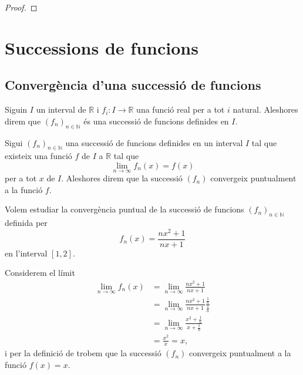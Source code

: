 \documentclass[../Apunts.tex]{subfiles}
\begin{document}
\begin{theorem}
\begin{proof}
\begin{comment}
			Aleshores amb \eqref{thm:Teorema de Cauchy:eq1} i \eqref{thm:Teorema de Cauchy:eq2} tenim que
			\[\abs{\sum_{n=1}^{m}a_{\sigma(n)}b_{\tau(n)}-\sum_{n=0}^{\infty}a_{n}\sum_{n=0}^{\infty}b_{n}}+\abs{\sum_{n=0}^{N}a_{n}\sum_{n=0}^{N}b_{n}-\sum_{n=0}^{\infty}a_{n}\sum_{n=0}^{\infty}b_{n}}\leq\varepsilon,\]
			i per la desigualtat triangular %
			\[\abs{\sum_{n=1}^{m}a_{\sigma(n)}b_{\tau(n)}-\sum_{n=0}^{N}a_{n}\sum_{n=0}^{N}b_{n}}+\abs{\sum_{n=0}^{N}a_{n}\sum_{n=0}^{N}b_{n}-\sum_{n=0}^{\infty}a_{n}\sum_{n=0}^{\infty}b_{n}}\leq\varepsilon,\]
		\end{comment}
		\end{proof}
	\end{theorem}
\section{Successions de funcions}
	\subsection{Convergència d'una successió de funcions}
	\begin{definition}
		\label{def:successió de funcions}
		Siguin \(I\) un interval de \(\mathbb{R}\) i \(f_{i}\colon I\longrightarrow\mathbb{R}\) una funció real per a tot \(i\) natural. Aleshores direm que \((f_{n})_{n\in\mathbb{N}}\) és una successió de funcions definides en \(I\).
	\end{definition}
	\begin{definition}
		\label{def:convergència puntual}
		Sigui \((f_{n})_{n\in\mathbb{N}}\) una successió de funcions definides en un interval \(I\) tal que existeix una funció \(f\) de \(I\) a \(\mathbb{R}\) tal que
		\[\lim_{n\to\infty}f_{n}(x)=f(x)\]
		per a tot \(x\) de \(I\). Aleshores direm que la successió \((f_{n})\) convergeix puntualment a la funció \(f\).
	\end{definition}
	\begin{example}
		\label{ex:convergència puntual d'una successió de funcions}
		Volem estudiar la convergència puntual de la successió de funcions \((f_{n})_{n\in\mathbb{N}}\) definida per
		\[f_{n}(x)=\frac{nx^{2}+1}{nx+1}\]
		en l'interval \([1,2]\).
		\begin{solution}
			Considerem el límit
			\begin{align*}
				\lim_{n\to\infty}f_{n}(x)&=\lim_{n\to\infty}\frac{nx^{2}+1}{nx+1} \\
				&=\lim_{n\to\infty}\frac{nx^{2}+1}{nx+1}\frac{\frac{1}{n}}{\frac{1}{n}} \\
				&=\lim_{n\to\infty}\frac{x^{2}+\frac{1}{n}}{x+\frac{1}{n}} \\
				&=\frac{x^{2}}{x}=x,
			\end{align*}
			i per la definició de  trobem que la successió \((f_{n})\) convergeix puntualment a la funció \(f(x)=x\).
		\end{solution}
	\end{example}
\end{document}
